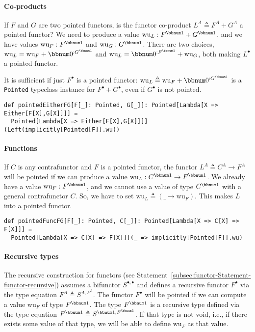 \paragraph{Co-products}

If $F$ and $G$ are two pointed functors, is the functor co-product
$L^{A}\triangleq F^{A}+G^{A}$ a pointed functor? We need to produce
a value $\text{wu}_{L}:F^{\bbnum 1}+G^{\bbnum 1}$, and we have values
$\text{wu}_{F}:F^{\bbnum 1}$ and $\text{wu}_{G}:G^{\bbnum 1}$. There
are two choices, $\text{wu}_{L}=\text{wu}_{F}+\bbnum 0^{:G^{\bbnum 1}}$
and $\text{wu}_{L}=\bbnum 0^{:F^{\bbnum 1}}+\text{wu}_{G}$, both
making $L^{\bullet}$ a pointed functor. 

It is sufficient if just $F^{\bullet}$ is a pointed functor: $\text{wu}_{L}\triangleq\text{wu}_{F}+\bbnum 0^{:G^{\bbnum 1}}$
is a \lstinline!Pointed! typeclass instance for $F^{\bullet}+G^{\bullet}$,
even if $G^{\bullet}$ is not pointed.
\begin{lstlisting}
def pointedEitherFG[F[_]: Pointed, G[_]]: Pointed[Lambda[X => Either[F[X],G[X]]]] =
  Pointed[Lambda[X => Either[F[X],G[X]]]](Left(implicitly[Pointed[F]].wu))
\end{lstlisting}


\paragraph{Functions}

If $C$ is any contrafunctor and $F$ is a pointed functor, the functor
$L^{A}\triangleq C^{A}\rightarrow F^{A}$ will be pointed if we can
produce a value $\text{wu}_{L}:C^{\bbnum 1}\rightarrow F^{\bbnum 1}$.
We already have a value $\text{wu}_{F}:F^{\bbnum 1}$, and we cannot
use a value of type $C^{\bbnum 1}$ with a general contrafunctor $C$.
So, we have to set $\text{wu}_{L}\triangleq(\_\rightarrow\text{wu}_{F})$.
This makes $L$ into a pointed functor.
\begin{lstlisting}
def pointedFuncFG[F[_]: Pointed, C[_]]: Pointed[Lambda[X => C[X] => F[X]]] =
  Pointed[Lambda[X => C[X] => F[X]]](_ => implicitly[Pointed[F]].wu)
\end{lstlisting}


\paragraph{Recursive types}

The recursive construction for functors (see Statement~\ref{subsec:functor-Statement-functor-recursive})
assumes a bifunctor $S^{\bullet,\bullet}$ and defines a recursive
functor $F^{\bullet}$ via the type equation $F^{A}\triangleq S^{A,F^{A}}$.
The functor $F^{\bullet}$ will be pointed if we can compute a value
$\text{wu}_{F}$ of type $F^{\bbnum 1}$. The type $F^{\bbnum 1}$
is a recursive type defined via the type equation $F^{\bbnum 1}\triangleq S^{\bbnum 1,F^{\bbnum 1}}$.
If that type is not void, i.e., if there exists some value of that
type, we will be able to define $\text{wu}_{F}$ as that value. 

